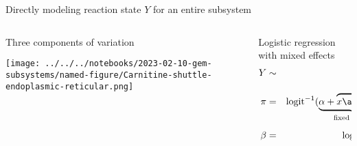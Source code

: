 \documentclass[aspectratio=169]{beamer}
\begin{document}
\begin{frame}{Directly modeling reaction state $Y$ for an entire subsystem}
\begin{columns}[t]
\begin{column}{0.5\textwidth}
  Three components of variation

\texttt{[image: ../../../notebooks/2023-02-10-gem-subsystems/named-figure/Carnitine-shuttle-endoplasmic-reticular.png]}
\end{column}

\begin{column}{0.5\textwidth}
  Logistic regression with mixed effects
\begin{eqnarray*}
Y &\sim& \mathrm{Bin}(n=2, \pi) \\
\pi &=& \mathrm{logit}^{-1} (\underbrace{\alpha + \overbrace{x
    \alert{\beta}}^\text{Dx}}_\text{fixed effects} + \underbrace{\overbrace{z_1
b_1}^\text{samples} + \overbrace{z_2 b_2}^\text{reactions}}_\text{random
effects}) \\
    \beta &=& \log \frac{\pi_{x=1} / (1 - \pi_{x=1})}{\pi_{x=0} / (1 - \pi_{x=0})} = \log \mathrm{OR}
\end{eqnarray*}
\end{column}
\end{columns}
\end{frame}
\end{document}
